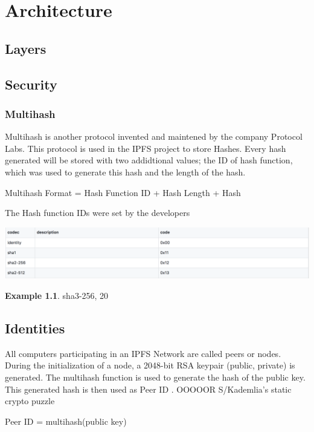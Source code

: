 \documentclass[a4paper,11pt, oneside]{report}
\theoremstyle{definition}
\newtheorem{exmp}{Example}[subsection]
\begin{document}
\chapter{Architecture}
\section{Layers}

\section{Security}
\subsection{Multihash}
Multihash is another protocol invented and maintened by the company Protocol Labs. This protocol is used in the IPFS project to store Hashes. Every hash generated will be stored with two addidtional values; the ID of hash function, which was used to generate this hash and the length of the hash.
\begin{center}
	Multihash Format = Hash Function ID + Hash Length + Hash
\end{center}
The Hash function IDs were set by the developers
\begin{center}
	\includegraphics[width=\textwidth]{img/multiformat_hashfunctionid.png}
\end{center}
\begin{exmp} sha3-256, 20

\end{exmp}

\section{Identities}
All computers participating in an IPFS Network are called peers or nodes.\\
During the initialization of a node, a 2048-bit RSA keypair (public, private) is generated. The multihash function is used to generate the hash of the public key. This generated hash is then used as Peer ID \cite{PeerID}. OOOOOR S/Kademlia’s static crypto puzzle
\begin{center}
Peer ID = multihash(public key)
\end{center}
\end{document}
